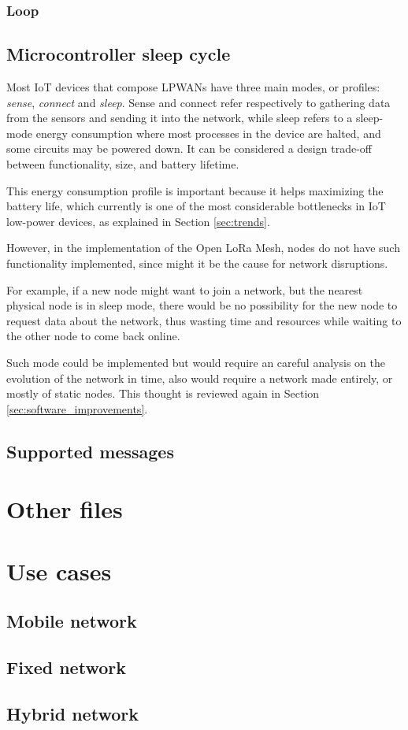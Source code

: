 			
			\subsubsection{Loop}
			
		\subsection{Microcontroller sleep cycle}\label{sec:sleep}
			
			Most IoT devices that compose LPWANs have three main modes, or profiles: \textit{sense}, \textit{connect} and \textit{sleep}.
			Sense and connect refer respectively to gathering data from the sensors and sending it into the network, while sleep refers to a sleep-mode energy consumption where most processes in the device are halted, and some circuits may be powered down.
			It can be considered a design trade-off between functionality, size, and battery lifetime.
						
			This energy consumption profile is important because it helps maximizing the battery life, which currently is one of the most considerable bottlenecks in IoT low-power devices, as explained in Section \ref{sec:trends}.
			
			However, in the implementation of the Open LoRa Mesh, nodes do not have such functionality implemented, since might it be the cause for network disruptions.
			
			For example, if a new node might want to join a network, but the nearest physical node is in sleep mode, there would be no possibility for the new node to request data about the network, thus wasting time and resources while waiting to the other node to come back online.
			
			Such mode could be implemented but would require an careful analysis on the evolution of the network in time, also would require a network made entirely, or mostly of static nodes.
			This thought is reviewed again in Section \ref{sec:software_improvements}.
			
		\subsection{Supported messages}
				
		
	\section{Other files}
			
	\section{Use cases}
		
		
		\subsection{Mobile network}
		
		\subsection{Fixed network}
		
		\subsection{Hybrid network}